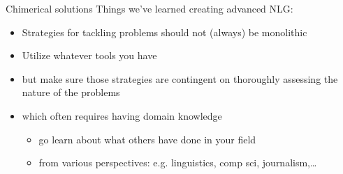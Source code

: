 \documentclass[10pt, compress]{beamer}		%
\begin{document}
\begin{frame}{Chimerical solutions}
	Things we've learned creating advanced NLG:

	\begin{itemize}
		\item Strategies for tackling problems should not (always) be monolithic
		\item Utilize whatever tools you have	\pause
		\item but make sure those strategies are contingent on thoroughly assessing the nature of the problems \pause
		\item which often requires having domain knowledge \pause
		\begin{itemize}
			\item go learn about what others have done in your field \pause
			\item from various perspectives: e.g. linguistics, comp sci, journalism,\ldots
		\end{itemize}
	\end{itemize}
\end{frame}









\end{document}
